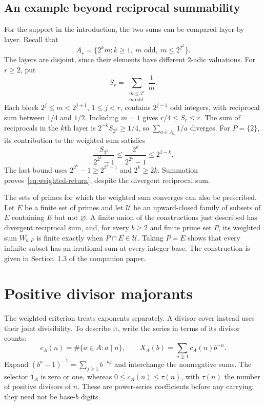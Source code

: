 \documentclass[11pt]{article}
\begin{document}
\subsection{An example beyond reciprocal summability}
For the support in the introduction, the two sums can be compared
layer by layer. Recall that
\[
 A_\star=\{2^k m:k\ge1,\ m\text{ odd},\ m\le2^{2^k}\}.
\]
The layers are disjoint, since their elements have different $2$-adic
valuations.  For $r\ge2$, put
\[
 S_r=\sum_{\substack{m\le2^r\\m\text{ odd}}}\frac1m.
\]
Each block $2^j\le m<2^{j+1}$, $1\le j<r$, contains $2^{j-1}$ odd
integers, with reciprocal sum between $1/4$ and $1/2$.  Including
$m=1$ gives $r/4\le S_r\le r$.  The sum of reciprocals in the $k$th layer
is $2^{-k}S_{2^k}\ge1/4$, so $\sum_{a\in A_\star}1/a$ diverges.  For
$P=\{2\}$, its contribution to the weighted sum satisfies
\[
 \frac{S_{2^k}}{2^{2^k}-1}
 \le\frac{2^k}{2^{2^k}-1}
 \le2^{1-k}.
\]
The last bound uses $2^{2^k}-1\ge2^{2^k-1}$ and $2^k\ge2k$.
Summation proves~\eqref{eq:weighted-return}, despite the divergent
reciprocal sum.


The sets of primes for which the weighted sum converges can also be
prescribed. Let $E$ be a finite set of primes and let $\mathcal U$ be an
upward-closed family of subsets of $E$ containing $E$ but not
$\varnothing$. A finite union of the constructions just described has
divergent reciprocal sum, and, for every $b\ge2$ and finite prime set $P$,
its weighted sum $W_{b,P}$ is finite exactly when $P\cap E\in\mathcal U$.
Taking $P=E$ shows that every infinite subset has an irrational sum at
every integer base.  The construction is given in
{Section~1.3 of the companion paper}.

\section{Positive divisor majorants}\label{sec:common-kernel}
The weighted criterion treats exponents separately. A divisor cover
instead uses their joint divisibility. To describe it, write the series
in terms of its divisor counts:
\begin{equation}
 c_A(n)=\#\{a\in A:a\mid n\},\qquad
 X_A(b)=\sum_{n\ge1}c_A(n)b^{-n}.
 \label{eq:incidence}
\end{equation}
Expand $(b^a-1)^{-1}=\sum_{j\ge1}b^{-aj}$ and interchange the
nonnegative sums. The selector $\mathbf1_A$ is zero or one, whereas
$0\le c_A(n)\le\tau(n)$, with $\tau(n)$ the number of positive
divisors of $n$. These are power-series coefficients before any carrying;
they need not be base-$b$ digits.
\end{document}
